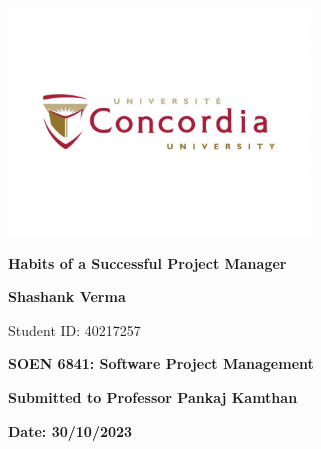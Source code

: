 \documentclass{article}
\begin{document}
\begin{titlepage}
    \centering
    \vspace*{1cm}
    \includegraphics[width=0.6\textwidth]{Logo.jpg} %
    \par\vspace{0.5cm}
    {\Huge\textbf{Habits of a Successful Project Manager}\par}
    \vspace{1.5cm}
    {\Large\textbf{Shashank Verma}\par}
    \vspace{0.5cm}
    {Student ID: 40217257\par}
    \vspace{2cm}
    {\Large\textbf{SOEN 6841: Software Project Management}\par}
    \vspace{1cm}
    {\large\textbf{Submitted to Professor Pankaj Kamthan}\par} %
    \vfill
    {\large\textbf{Date: 30/10/2023}\par}
\end{titlepage}

\newpage
\tableofcontents
\newpage
{}

\end{document}

